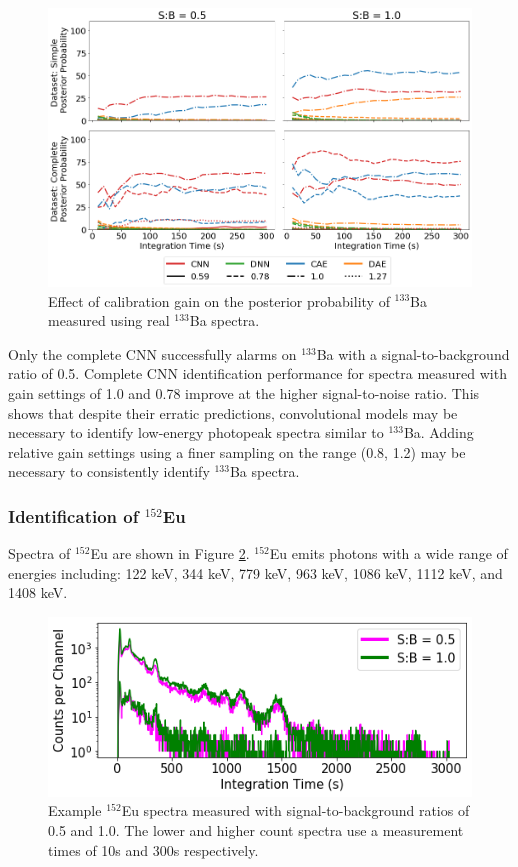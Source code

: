\begin{figure}[H]
	\centering
	\includegraphics[width=1.0\linewidth]{images/realspectra-cal-ba133}
	\caption{Effect of calibration gain on the posterior probability of $^{133}$Ba measured using real $^{133}$Ba spectra.}
	\label{fig:realspectra-cal-ba133}
\end{figure}

Only the complete CNN successfully alarms on $^{133}$Ba with a signal-to-background ratio of 0.5. Complete CNN identification performance for spectra measured with gain settings of 1.0 and 0.78 improve at the higher signal-to-noise ratio. This shows that despite their erratic predictions, convolutional models may be necessary to identify low-energy photopeak spectra similar to $^{133}$Ba. Adding relative gain settings using a finer sampling on the range (0.8, 1.2) may be necessary to consistently identify $^{133}$Ba spectra.


\subsubsection{Identification of $^{152}$Eu}

Spectra of $^{152}$Eu are shown in Figure \ref{fig:realspectra-cal-eu152-spec}. $^{152}$Eu emits photons with a wide range of energies including: 122 keV, 344 keV, 779 keV, 963 keV, 1086 keV, 1112 keV, and 1408 keV. 

\begin{figure}[H]
	\centering
	\includegraphics[width=0.85\linewidth]{images/realspectra-cal-eu152-spec}
	\caption{Example $^{152}$Eu spectra measured with signal-to-background ratios of 0.5 and 1.0. The lower and higher count spectra use a measurement times of 10s and 300s respectively.}
	\label{fig:realspectra-cal-eu152-spec}
\end{figure}

